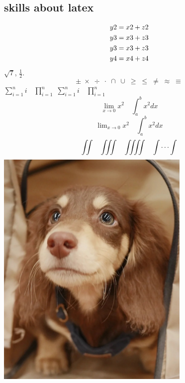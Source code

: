 \subsection{skills about latex}
\begin{align} 
    y2=x2+z2 \label{4}\\
    y3=x3+z3 \label{5}\\
    y3=x3+z3 \notag \\
    y4=x4+z4 \label{6}
\end{align}
$\sqrt{7}$, $\frac{1}{2}$.
\[ \pm\; \times \; \div\; \cdot\; \cap\; \cup\;\geq\; \leq\; \neq\; \approx \; \equiv \]
$ \sum_{i=1}^n i\quad \prod_{i=1}^n $  %
$ \sum\limits _{i=1}^n i\quad \prod\limits _{i=1}^n $ %
\[ \lim_{x\to0}x^2 \quad \int_a^b x^2 dx \]
\[ \lim\nolimits _{x\to0}x^2\quad \int\nolimits_a^b x^2 dx \]
\[ \iint\quad \iiint\quad \iiiint\quad \idotsint \]
\centering
\includegraphics[width=0.7\textwidth]{dog.jpg}